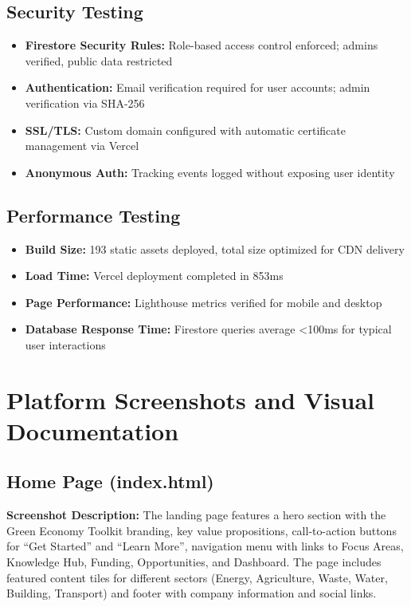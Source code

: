 \documentclass[a4paper,12pt]{article}
\begin{document}
\subsection{Security Testing}
\begin{itemize}
    \item \textbf{Firestore Security Rules:} Role-based access control enforced; admins verified, public data restricted
    \item \textbf{Authentication:} Email verification required for user accounts; admin verification via SHA-256
    \item \textbf{SSL/TLS:} Custom domain configured with automatic certificate management via Vercel
    \item \textbf{Anonymous Auth:} Tracking events logged without exposing user identity
\end{itemize}

\subsection{Performance Testing}
\begin{itemize}
    \item \textbf{Build Size:} 193 static assets deployed, total size optimized for CDN delivery
    \item \textbf{Load Time:} Vercel deployment completed in 853ms
    \item \textbf{Page Performance:} Lighthouse metrics verified for mobile and desktop
    \item \textbf{Database Response Time:} Firestore queries average <100ms for typical user interactions
\end{itemize}

\section{Platform Screenshots and Visual Documentation}

\subsection{Home Page (index.html)}
\textbf{Screenshot Description:} The landing page features a hero section with the Green Economy Toolkit branding, key value propositions, call-to-action buttons for ``Get Started'' and ``Learn More'', navigation menu with links to Focus Areas, Knowledge Hub, Funding, Opportunities, and Dashboard. The page includes featured content tiles for different sectors (Energy, Agriculture, Waste, Water, Building, Transport) and footer with company information and social links.
\end{document}
